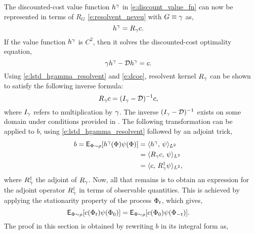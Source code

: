 The discounted-cost value function $h^\gamma$ in \eqref{e:discount_value_fn} can now be represented in terms of $R_G$ \eqref{e:resolvent_neveu} with $G \equiv \gamma$ as,
\begin{equation}
h^\discount = R_\discount c.
\label{e:lstd_hgamma_resolvent}
\end{equation}
If the value function $h^\gamma$ is $C^2$, then it solves the discounted-cost optimality equation,
\begin{equation}
\discount h^\discount - \generate h^\discount =  c.
\label{e:dcoe}
\end{equation}
Using \eqref{e:lstd_hgamma_resolvent} and \eqref{e:dcoe}, resolvent kernel $R_\gamma$ can be shown to satisfy the following inverse formula:
\[
R_\gamma c = ( I_\gamma - {\cal D})^{-1} c,
\]
where $I_\gamma$ refers to multiplication by $\gamma$. The inverse $(I_\gamma - {\cal D})^{-1}$ exists on some domain under conditions provided in \cite{}.  
The following transformation can be applied to $b$, using \eqref{e:lstd_hgamma_resolvent} followed by an adjoint trick,
\[
\begin{aligned}
b = {\sf E}_{\Phi \sim \rho} [h^\gamma(\Phi) \psi(\Phi) ] &= \langle h^\gamma, \, \psi \rangle_{L^2}\\
& = \langle R_\gamma c, \,\psi \rangle_{L^2} \\
& = \langle c,\, R^\dagger_\gamma \psi \rangle_{L^2},
\end{aligned}
\]
where $R^\dagger_\gamma$ the adjoint of $R_\gamma$. Now, all that remains is to obtain an expression for the adjoint operator $R^\dagger_\gamma$ in terms of observable quantities. This is achieved by applying the stationarity property of the process $\Phi_t$, which gives, 
\[
{\sf E}_{\Phi \sim \rho}[c(\Phi_t) \psi(\Phi_0)] = {\sf E}_{\Phi \sim \rho} [c(\Phi_0) \psi(\Phi_{-t})].
\] 
The proof in this section is obtained by rewriting $b$ in its integral form as,
